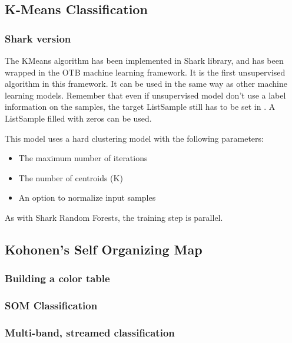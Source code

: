 \subsection{K-Means Classification}
\label{sec:KMeansClassifier}

\subsubsection{Shark version}

The KMeans algorithm has been implemented in Shark library, and has been
wrapped in the OTB machine learning framework. It is the first unsupervised
algorithm in this framework. It can be used in the same way as other machine
learning models. Remember that even if unsupervised model don't use a label
information on the samples, the target ListSample still has to be set in
. A ListSample filled with zeros can be used.

This model uses a hard clustering model with the following parameters:
\begin{itemize}
\item The maximum number of iterations
\item The number of centroids (K)
\item An option to normalize input samples
\end{itemize}

As with Shark Random Forests, the training step is parallel.

\subsection{Kohonen's Self Organizing Map}
\label{sec:SOM}

\subsubsection{Building a color table}
\label{sec:SOMColorTable}

\subsubsection{SOM Classification}
\label{sec:SOMClassification}


\subsubsection{Multi-band, streamed classification}

\ifitkFullVersion

\fi

